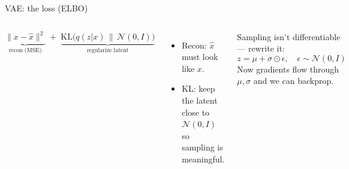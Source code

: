 \documentclass[
11pt,notheorems,hyperref={pdfauthor=whatever}
]{beamer}
\begin{document}
\begin{frame}{VAE: the loss (ELBO)}
\small
\begin{columns}[c,onlytextwidth]
    \begin{tcolorbox}[medicalglass, title=\textbf{\color{accAmber}Two terms}]
    \[
    \underbrace{\|x-\hat{x}\|^2}_{\text{recon (MSE)}}
    \;+\;
    \underbrace{\mathrm{KL}\!\big(q(z|x)\,\|\,\mathcal{N}(0,I)\big)}_{\text{regularize latent}}
    \]
    \end{tcolorbox}
    \begin{itemize}\small\setlength\itemsep{0.35em}
        \item Recon: $\hat{x}$ must look like $x$.
        \item KL: keep the latent close to $\mathcal{N}(0,I)$ so sampling is meaningful.
    \end{itemize}

    \begin{tcolorbox}[medicalglass, title=\textbf{\color{accTeal}Reparameterization}]
    Sampling isn't differentiable --- rewrite it:
    \[
    z=\mu+\sigma\odot\epsilon,\quad \epsilon\sim\mathcal{N}(0,I)
    \]
    Now gradients flow through $\mu,\sigma$ and we can backprop.
    \end{tcolorbox}
\end{columns}
\end{frame}
\end{document}
